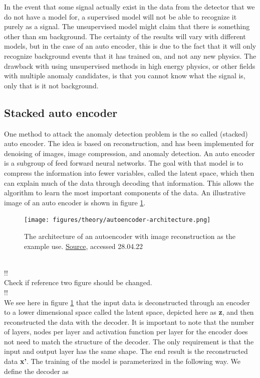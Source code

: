 \documentclass[ reprint, amsmath,amssymb, aps, nofootinbib]{revtex4-2}
\begin{document}
In the event that some signal actually exist in the data from the detector that we do not have a model for, a supervised model will not be able to recognize it purely as a signal. The unsupervised model might claim that there is something other than sm background. The certainty of the results will vary with different models, but in the case of an auto encoder, this is due to the fact that it will only recognize background events that it has trained on, and not any new physics. The drawback with using unsupervised methods in high energy physics, or other fields with multiple anomaly candidates, is that you cannot know what the signal is, only that is it not background. \par 



\subsection{Stacked auto encoder}
One method to attack the anomaly detection problem is the so called (stacked) auto encoder. The idea is based on reconstruction, and has been implemented for denoising of images, image compression, and anomaly detection. 
An auto encoder is a subgroup of feed forward neural networks\cite{FYSSTK}. The goal with that model is to compress the information into fewer variables, called the latent space, which then can explain much of the data through decoding that information. This allows the algorithm to learn the most important components of the data. An illustrative image of an auto encoder is shown in figure \ref{fig:auto_en_archi}. 

\begin{figure}[H]
    \centering
    \texttt{[image: figures/theory/autoencoder-architecture.png]}
    \caption{The architecture of an autoencoder with image reconstruction as the example use. \href{https://lilianweng.github.io/posts/2018-08-12-vae/}{Source}, accessed 28.04.22}
    \label{fig:auto_en_archi}
\end{figure}
\\!!\\
Check if reference two figure should be changed.
\\!!\\

We see here in figure \ref{fig:auto_en_archi} that the input data is deconstructed through an encoder to a lower dimensional space called the latent space, depicted here as \textbf{z}, and then reconstructed the data with the decoder. It is important to note that the number of layers, nodes per layer and activation function per layer for the encoder does not need to match the structure of the decoder. The only requirement is that the input and output layer has the same shape. The end result is the reconstructed data \textbf{x'}. The training of the model is parameterized in the following way. We define the decoder as 
\end{document}
